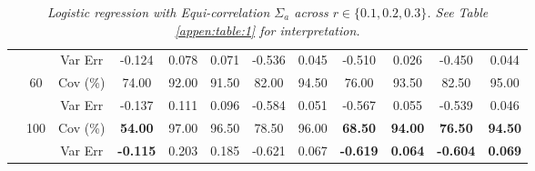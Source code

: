 \begin{table}[!h]
{\begin{tabular}{|c|c|c|c|cccccccc|}
&
&
Var Err &
-0.124 &
0.078 &
\multicolumn{1}{c|}{0.071} &
-0.536 &
\multicolumn{1}{c|}{0.045} &
-0.510 &
\multicolumn{1}{c|}{0.026} &
-0.450 &
0.044 \\ \cline{2-12} 
&
\multirow{2}{*}{60} &
Cov (\%) &
74.00 &
92.00 &
\multicolumn{1}{c|}{91.50} &
82.00 &
\multicolumn{1}{c|}{94.50} &
76.00 &
\multicolumn{1}{c|}{93.50} &
82.50 &
95.00 \\
&
&
Var Err &
-0.137 &
0.111 &
\multicolumn{1}{c|}{0.096} &
-0.584 &
\multicolumn{1}{c|}{0.051} &
-0.567 &
\multicolumn{1}{c|}{0.055} &
-0.539 &
0.046 \\ \cline{2-12} 
&
\multirow{2}{*}{100} &
Cov (\%) &
\textbf{54.00} &
97.00 &
\multicolumn{1}{c|}{96.50} &
78.50 &
\multicolumn{1}{c|}{96.00} &
\textbf{68.50} &
\multicolumn{1}{c|}{\textbf{94.00}} &
\textbf{76.50} &
\textbf{94.50} \\
&
&
Var Err &
\textbf{-0.115} &
0.203 &
\multicolumn{1}{c|}{0.185} &
-0.621 &
\multicolumn{1}{c|}{0.067} &
\textbf{-0.619} &
\multicolumn{1}{c|}{\textbf{0.064}} &
\textbf{-0.604} &
\textbf{0.069} \\ \hline		
\end{tabular}}
\caption{\textit{Logistic regression with Equi-correlation $\Sigma_a$ across $r\in\{0.1, 0.2, 0.3\}$. See Table \ref{appen:table:1} for interpretation.}}
\label{appen:table:4}
\end{table}



